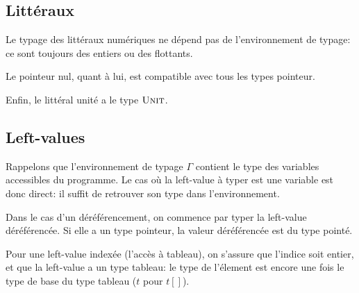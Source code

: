 \subsection*{Littéraux}

Le typage des littéraux numériques ne dépend pas de l'environnement de typage:
ce sont toujours des entiers ou des flottants.

\begin{mathpar}



\end{mathpar}

Le pointeur nul, quant à lui, est compatible avec tous les types pointeur.

\begin{mathpar}
\end{mathpar}

Enfin, le littéral unité a le type $\tUnit$.

\begin{mathpar}
\end{mathpar}

\subsection*{Left-values}

Rappelons que l'environnement de typage $Γ$ contient le type des variables
accessibles du programme. Le cas où la left-value à typer est une variable est
donc direct: il suffit de retrouver son type dans l'environnement.

\begin{mathpar}
\end{mathpar}

Dans le cas d'un déréférencement, on commence par typer la left-value
déréférencée. Si elle a un type pointeur, la valeur déréférencée est du type
pointé.

\begin{mathpar}
\end{mathpar}

Pour une left-value indexée (l'accès à tableau), on s'assure que l'indice soit
entier, et que la left-value a un type tableau: le type de l'élement est encore
une fois le type de base du type tableau ($t$ pour $t[]$).

\begin{mathpar}
\end{mathpar}

